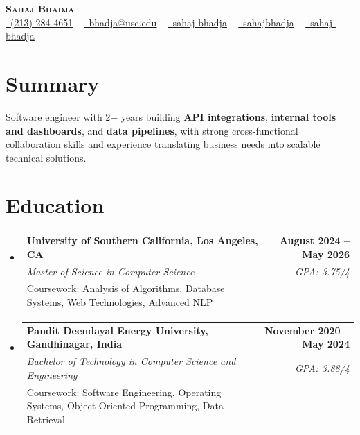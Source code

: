 \documentclass[letterpaper,10pt]{article}
\makeatletter
\newcommand{\resumeEduSubheading}[5]{\vspace{-1pt}\item\begin{tabular*}{1.0\textwidth}[t]{l@{\extracolsep{\fill}}r}\textbf{#1} & \textbf{\small #2} \\\textit{\small #3} & \textit{\small #4} \\\small #5 & \\\end{tabular*}\vspace{-4pt}}
\newcommand{\resumeSubHeadingListStart}{\begin{itemize}[leftmargin=0.0in, label={}]}
\newcommand{\resumeSubHeadingListEnd}{\end{itemize}}
\makeatother
\begin{document}
\begin{center}
{\Huge \scshape \textbf{Sahaj Bhadja}} \\ \vspace{1pt}
\small \href{tel:(213) 284-4651}{\faPhone\ \underline{(213) 284-4651}} ~ \href{mailto: bhadja@usc.edu}{\raisebox{-0.2\height}\faEnvelope\ \underline{bhadja@usc.edu}} ~
\href{https://www.linkedin.com/in/sahaj-bhadja/}{\raisebox{-0.2\height}\faLinkedin\ \underline{sahaj-bhadja}} ~ \href{https://github.com/SAHAJ-BHADJA}{\raisebox{-0.2\height}\faGithub\ \underline{sahajbhadja}} ~
\href{https://sahaj-bhadja.vercel.app/}{\raisebox{-0.2\height}\faGlobe\ \underline{sahaj-bhadja}}
\end{center}
\vspace{-18pt}
\section{Summary}
\begin{itemize}[leftmargin=0.15in, label={}]
\small{\item{Software engineer with 2+ years building \textbf{API integrations}, \textbf{internal tools and dashboards}, and \textbf{data pipelines}, with strong cross-functional collaboration skills and experience translating business needs into scalable technical solutions.}}
\end{itemize}
\vspace{-16pt}
\section{Education}
\resumeSubHeadingListStart
\resumeEduSubheading{University of Southern California, Los Angeles, CA}{August 2024 -- May 2026}{Master of Science in Computer Science}{GPA: 3.75/4}{Coursework: Analysis of Algorithms, Database Systems, Web Technologies, Advanced NLP}
\vspace{-9pt}
\resumeEduSubheading{Pandit Deendayal Energy University, Gandhinagar, India}{November 2020 -- May 2024}{Bachelor of Technology in Computer Science and Engineering}{GPA: 3.88/4}{Coursework: Software Engineering, Operating Systems, Object-Oriented Programming, Data Retrieval}
\resumeSubHeadingListEnd
\vspace{-14pt}
\end{document}
